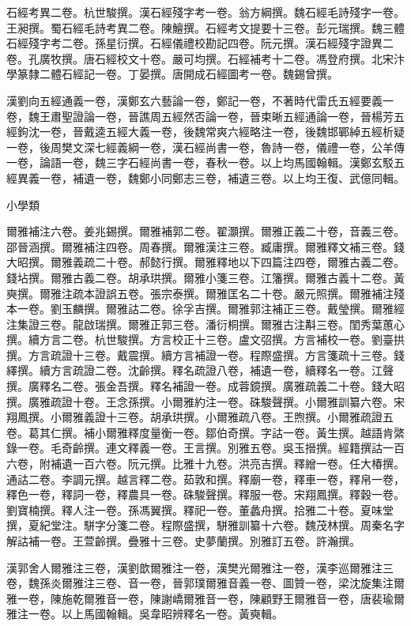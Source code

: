 \begin{pinyinscope}
石經考異二卷。杭世駿撰。漢石經殘字考一卷。翁方綱撰。魏石經毛詩殘字一卷。王昶撰。蜀石經毛詩考異二卷。陳鱣撰。石經考文提要十三卷。彭元瑞撰。魏三體石經殘字考二卷。孫星衍撰。石經儀禮校勘記四卷。阮元撰。漢石經殘字證異二卷。孔廣牧撰。唐石經校文十卷。嚴可均撰。石經補考十二卷。馮登府撰。北宋汴學篆隸二體石經記一卷。丁晏撰。唐開成石經圖考一卷。魏錫曾撰。

漢劉向五經通義一卷，漢鄭玄六藝論一卷，鄭記一卷，不著時代雷氏五經要義一卷，魏王肅聖證論一卷，晉譙周五經然否論一卷，晉束晰五經通論一卷，晉楊芳五經鉤沈一卷，晉戴逵五經大義一卷，後魏常爽六經略注一卷，後魏邯鄲綽五經析疑一卷，後周樊文深七經義綱一卷，漢石經尚書一卷，魯詩一卷，儀禮一卷，公羊傳一卷，論語一卷，魏三字石經尚書一卷，春秋一卷。以上均馬國翰輯。漢鄭玄駁五經異義一卷，補遺一卷，魏鄭小同鄭志三卷，補遺三卷。以上均王復、武億同輯。

小學類

爾雅補注六卷。姜兆錫撰。爾雅補郭二卷。翟灝撰。爾雅正義二十卷，音義三卷。邵晉涵撰。爾雅補注四卷。周春撰。爾雅漢注三卷。臧庸撰。爾雅釋文補三卷。錢大昭撰。爾雅義疏二十卷。郝懿行撰。爾雅釋地以下四篇注四卷，爾雅古義二卷。錢坫撰。爾雅古義二卷。胡承珙撰。爾雅小箋三卷。江籓撰。爾雅古義十二卷。黃奭撰。爾雅注疏本證誤五卷。張宗泰撰。爾雅匡名二十卷。嚴元照撰。爾雅補注殘本一卷。劉玉麟撰。爾雅詁二卷。徐孚吉撰。爾雅郭注補正三卷。戴瑩撰。爾雅經注集證三卷。龍啟瑞撰。爾雅正郭三卷。潘衍桐撰。爾雅古注斠三卷。閨秀葉蕙心撰。續方言二卷。杭世駿撰。方言校正十三卷。盧文弨撰。方言補校一卷。劉臺拱撰。方言疏證十三卷。戴震撰。續方言補證一卷。程際盛撰。方言箋疏十三卷。錢繹撰。續方言疏證二卷。沈齡撰。釋名疏證八卷，補遺一卷，續釋名一卷。江聲撰。廣釋名二卷。張金吾撰。釋名補證一卷。成蓉鏡撰。廣雅疏義二十卷。錢大昭撰。廣雅疏證十卷。王念孫撰。小爾雅約注一卷。硃駿聲撰。小爾雅訓纂六卷。宋翔鳳撰。小爾雅義證十三卷。胡承珙撰。小爾雅疏八卷。王煦撰。小爾雅疏證五卷。葛其仁撰。補小爾雅釋度量衡一卷。鄒伯奇撰。字詁一卷。黃生撰。越語肯綮錄一卷。毛奇齡撰。連文釋義一卷。王言撰。別雅五卷。吳玉搢撰。經籍撰詁一百六卷，附補遺一百六卷。阮元撰。比雅十九卷。洪亮吉撰。釋繒一卷。任大椿撰。通詁二卷。李調元撰。越言釋二卷。茹敦和撰。釋廟一卷，釋車一卷，釋帛一卷，釋色一卷，釋詞一卷，釋農具一卷。硃駿聲撰。釋服一卷。宋翔鳳撰。釋穀一卷。劉寶楠撰。釋人注一卷。孫馮翼撰。釋祀一卷。董蠡舟撰。拾雅二十卷。夏味堂撰，夏紀堂注。駢字分箋二卷。程際盛撰，駢雅訓纂十六卷。魏茂林撰。周秦名字解詁補一卷。王萱齡撰。疊雅十三卷。史夢蘭撰。別雅訂五卷。許瀚撰。

漢郭舍人爾雅注三卷，漢劉歆爾雅注一卷，漢樊光爾雅注一卷，漢李巡爾雅注三卷，魏孫炎爾雅注三卷、音一卷，晉郭璞爾雅音義一卷、圖贊一卷，梁沈旋集注爾雅一卷，陳施乾爾雅音一卷，陳謝嶠爾雅音一卷，陳顧野王爾雅音一卷，唐裴瑜爾雅注一卷。以上馬國翰輯。吳韋昭辨釋名一卷。黃奭輯。


\end{pinyinscope}
